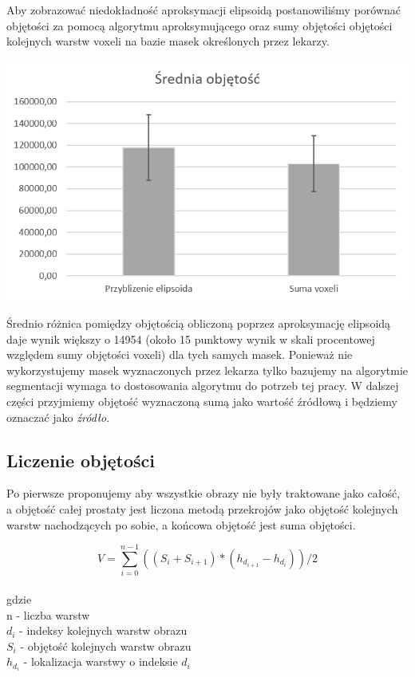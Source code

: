\documentclass[a4paper,11pt,twoside]{report}
\theoremstyle{definition}
\begin{document}
Aby zobrazować niedokładność aproksymacji elipsoidą postanowiliśmy porównać objętości za pomocą algorytmu aproksymującego oraz sumy objętości objętości kolejnych warstw voxeli na bazie masek określonych przez lekarzy. 

\begin{minipage}{\linewidth}
	\centering
	\includegraphics[width=\textwidth]{WstepObjetosc.png}
\end{minipage}

Średnio różnica pomiędzy objętością obliczoną poprzez aproksymację elipsoidą daje wynik większy o 14954 (około 15 punktowy wynik w skali procentowej względem sumy objętości voxeli) dla tych samych masek. Ponieważ nie wykorzystujemy masek wyznaczonych przez lekarza tylko bazujemy na algorytmie segmentacji wymaga to dostosowania algorytmu do potrzeb tej pracy. W dalszej części przyjmiemy objętość wyznaczoną sumą jako wartość źródłową i będziemy oznaczać jako \textit{źródło}.

\subsection{Liczenie objętości}

Po pierwsze proponujemy aby wszystkie obrazy nie były traktowane jako całość, a objętość całej prostaty jest liczona metodą przekrojów jako objętość kolejnych warstw nachodzących po sobie, a końcowa objętość jest suma objętości. 

\[V = \sum_{i=0}^{n-1} ((S_i + S_{i+1}) * (h_{d_{i+1}} - h_{d_i})) / 2 \]
\\
gdzie\\
n - liczba warstw \\
\(d_i\) - indeksy kolejnych warstw obrazu \\
\(S_i\) - objętość kolejnych warstw obrazu \\
\(h_{d_i}\) - lokalizacja warstwy o indeksie \(d_{i}\) \\
\end{document}

